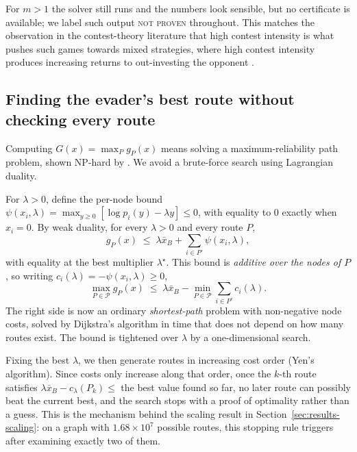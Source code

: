\documentclass[11pt,a4paper]{article}
\theoremstyle{plain}
\theoremstyle{definition}
\newcommand{\XB}{\bar{x}_B}
\newcommand{\Path}{\mathcal{P}}
\begin{document}
For $m>1$ the solver still runs and the numbers look sensible, but no
certificate is available; we label such output \textsc{not proven}
throughout. This matches the observation in the contest-theory literature
that high contest intensity is what pushes such games towards mixed
strategies, where high contest intensity produces increasing returns to
out-investing the opponent \citep{hausken2008}.

\subsection{Finding the evader's best route without checking every route}
\label{sec:oracle}

Computing $G(x)=\max_P g_P(x)$ means solving a maximum-reliability path
problem, shown NP-hard by \citet{nguyen2023}. We avoid a brute-force
search using Lagrangian duality.

For $\lambda>0$, define the per-node bound
$\psi(x_i,\lambda)=\max_{y\ge0}[\log p_i(y)-\lambda y]\le0$, with equality
to $0$ exactly when $x_i=0$. By weak duality, for every $\lambda>0$ and
every route $P$,
\begin{equation}
  g_P(x)\;\le\;\lambda\XB+\sum_{i\in P^{\circ}}\psi(x_i,\lambda),
  \label{eq:dual-bound}
\end{equation}
with equality at the best multiplier $\lambda^{\star}$. This bound is
\emph{additive over the nodes of $P$}, so writing
$c_i(\lambda)=-\psi(x_i,\lambda)\ge0$,
\begin{equation}
  \max_{P\in\Path} g_P(x)
  \;\le\;
  \lambda\XB-\min_{P\in\Path}\sum_{i\in P^{\circ}}c_i(\lambda).
  \label{eq:sp-bound}
\end{equation}
The right side is now an ordinary \emph{shortest-path} problem with
non-negative node costs, solved by Dijkstra's algorithm in time that does
not depend on how many routes exist. The bound is tightened over
$\lambda$ by a one-dimensional search.

Fixing the best $\lambda$, we then generate routes in increasing cost
order (Yen's algorithm). Since costs only increase along that order, once
the $k$-th route satisfies
$\lambda\XB-c_\lambda(P_k)\le$ the best value found so far, no later route
can possibly beat the current best, and the search stops with a proof of
optimality rather than a guess. This is the mechanism behind the scaling
result in Section~\ref{sec:results-scaling}: on a graph with $1.68\times
10^7$ possible routes, this stopping rule triggers after examining
exactly two of them.
\end{document}
